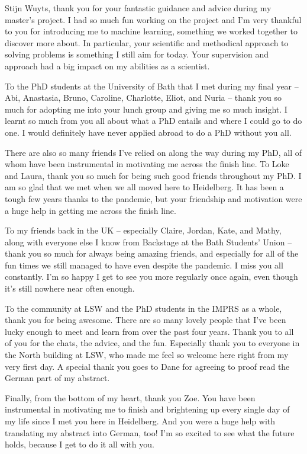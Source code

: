 Stijn Wuyts, thank you for your fantastic guidance and advice during my master's project. I had so much fun working on the project and I'm very thankful to you for introducing me to machine learning, something we worked together to discover more about. In particular, your scientific and methodical approach to solving problems is something I still aim for today. Your supervision and approach had a big impact on my abilities as a scientist.

To the PhD students at the University of Bath that I met during my final year -- Abi, Anastasia, Bruno, Caroline, Charlotte, Eliot, and Nuria -- thank you so much for adopting me into your lunch group and giving me so much insight. I learnt so much from you all about what a PhD entails and where I could go to do one. I would definitely have never applied abroad to do a PhD without you all.

There are also so many friends I've relied on along the way during my PhD, all of whom have been instrumental in motivating me across the finish line. To Loke and Laura, thank you so much for being such good friends throughout my PhD. I am so glad that we met when we all moved here to Heidelberg. It has been a tough few years thanks to the pandemic, but your friendship and motivation were a huge help in getting me across the finish line.

To my friends back in the UK -- especially Claire, Jordan, Kate, and Mathy, along with everyone else I know from Backstage at the Bath Students' Union -- thank you so much for always being amazing friends, and especially for all of the fun times we still managed to have even despite the pandemic. I miss you all constantly. I'm so happy I get to see you more regularly once again, even though it's still nowhere near often enough.

To the community at LSW and the PhD students in the IMPRS as a whole, thank you for being awesome. There are so many lovely people that I've been lucky enough to meet and learn from over the past four years. Thank you to all of you for the chats, the advice, and the fun. Especially thank you to everyone in the North building at LSW, who made me feel so welcome here right from my very first day. A special thank you goes to Dane for agreeing to proof read the German part of my abstract.

Finally, from the bottom of my heart, thank you Zoe. You have been instrumental in motivating me to finish and brightening up every single day of my life since I met you here in Heidelberg. And you were a huge help with translating my abstract into German, too! I'm so excited to see what the future holds, because I get to do it all with you.
